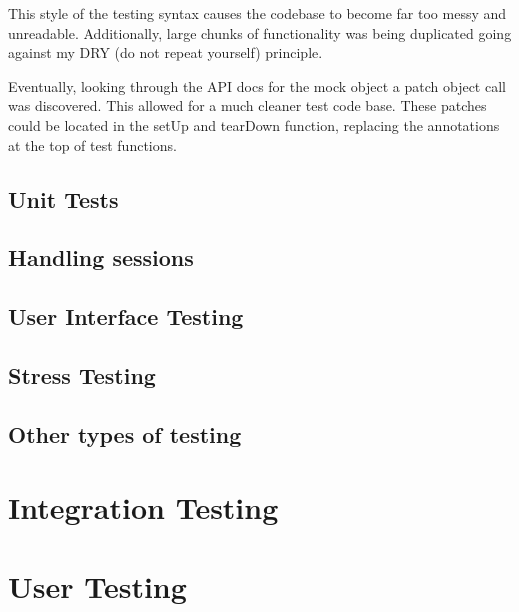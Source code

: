 This style of the testing syntax causes the codebase to become far too messy and unreadable. Additionally, large chunks of functionality was being duplicated going against my DRY (do not repeat yourself) principle.

Eventually, looking through the API docs for the mock object a patch object call was discovered. This allowed for a much cleaner test code base. These patches could be located in the setUp and tearDown function, replacing the annotations at the top of test functions.



\subsection{Unit Tests}

\subsection{Handling sessions}

\subsection{User Interface Testing}

\subsection{Stress Testing}

\subsection{Other types of testing}

\section{Integration Testing}

\section{User Testing}

